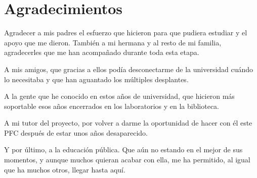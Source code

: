 \chapter*{Agradecimientos}

Agradecer a mis padres el esfuerzo que hicieron para que pudiera estudiar y el apoyo que me dieron. También a mi hermana y al resto de mi familia, agradecerles que me han acompañado durante toda esta etapa.

A mis amigos, que gracias a ellos podía desconectarme de la universidad cuándo lo necesitaba y que han aguantado los múltiples desplantes.

A la gente que he conocido en estos años de universidad, que hicieron más soportable esos años encerrados en los laboratorios y en la biblioteca.

A mi tutor del proyecto, por volver a darme la oportunidad de hacer con él este PFC después de estar unos años desaparecido.

Y por último, a la educación pública. Que aún no estando en el mejor de sus momentos, y aunque muchos quieran acabar con ella, me ha permitido, al igual que ha muchos otros, llegar hasta aquí.
